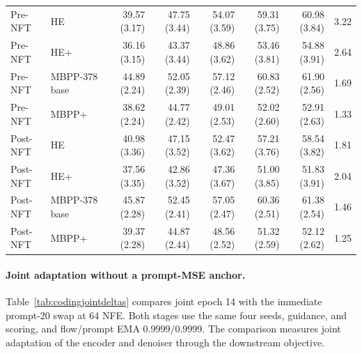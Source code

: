\documentclass[11pt,letterpaper]{article}
\begin{document}
\begin{table}[htbp]
\begin{tabular}{@{}llrrrrrr@{}}
Pre-NFT & HE & 39.57 {\scriptsize (3.17)} & 47.75 {\scriptsize (3.44)} & 54.07 {\scriptsize (3.59)} & 59.31 {\scriptsize (3.75)} & 60.98 {\scriptsize (3.84)} & 3.22\\
Pre-NFT & HE+ & 36.16 {\scriptsize (3.15)} & 43.37 {\scriptsize (3.44)} & 48.86 {\scriptsize (3.62)} & 53.46 {\scriptsize (3.81)} & 54.88 {\scriptsize (3.91)} & 2.64\\
Pre-NFT & MBPP-378 base & 44.89 {\scriptsize (2.24)} & 52.05 {\scriptsize (2.39)} & 57.12 {\scriptsize (2.46)} & 60.83 {\scriptsize (2.52)} & 61.90 {\scriptsize (2.56)} & 1.69\\
Pre-NFT & MBPP+ & 38.62 {\scriptsize (2.24)} & 44.77 {\scriptsize (2.42)} & 49.01 {\scriptsize (2.53)} & 52.02 {\scriptsize (2.60)} & 52.91 {\scriptsize (2.63)} & 1.33\\
Post-NFT & HE & 40.98 {\scriptsize (3.36)} & 47.15 {\scriptsize (3.52)} & 52.47 {\scriptsize (3.62)} & 57.21 {\scriptsize (3.76)} & 58.54 {\scriptsize (3.82)} & 1.81\\
Post-NFT & HE+ & 37.56 {\scriptsize (3.35)} & 42.86 {\scriptsize (3.52)} & 47.36 {\scriptsize (3.67)} & 51.00 {\scriptsize (3.85)} & 51.83 {\scriptsize (3.91)} & 2.04\\
Post-NFT & MBPP-378 base & 45.87 {\scriptsize (2.28)} & 52.45 {\scriptsize (2.41)} & 57.05 {\scriptsize (2.47)} & 60.36 {\scriptsize (2.51)} & 61.38 {\scriptsize (2.54)} & 1.46\\
Post-NFT & MBPP+ & 39.37 {\scriptsize (2.28)} & 44.87 {\scriptsize (2.44)} & 48.56 {\scriptsize (2.52)} & 51.32 {\scriptsize (2.59)} & 52.12 {\scriptsize (2.62)} & 1.25\\
\bottomrule
\end{tabular}
\end{table}

\paragraph{Joint adaptation without a prompt-MSE anchor.}
Table~\ref{tab:codingjointdeltas} compares joint epoch 14 with the immediate prompt-20 swap at 64 NFE. Both stages use the same four seeds, guidance, and scoring, and flow/prompt EMA $0.9999/0.9999$. The comparison measures joint adaptation of the encoder and denoiser through the downstream objective.
\end{document}
